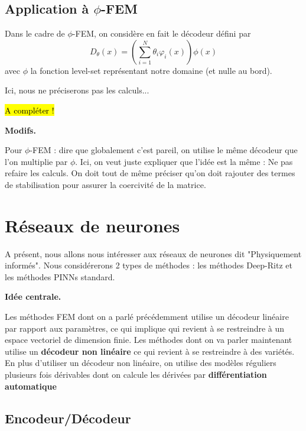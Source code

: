 \documentclass[french]{article}
\begin{document}
	\subsection{Application à $\phi$-FEM}
	
	Dans le cadre de $\phi$-FEM, on considère en fait le décodeur défini par
	\begin{equation*}
		D_\theta(x) = \left(\sum_{i=1}^N \theta_i \varphi_i(x)\right)\phi(x)
	\end{equation*}
	avec $\phi$ la fonction level-set représentant notre domaine (et nulle au bord).
	
	Ici, nous ne préciserons pas les calculs...
	
	\hl{A compléter !}
	
	\begin{tcolorbox}[
		colback=white, %
		colframe=red!70!black, %
		arc=2mm, %
		boxrule=1pt, %
		breakable, enhanced jigsaw
		]
		\textcolor{red!70!black}{\textbf{Modifs.} \\}
		
		Pour $\phi$-FEM : dire que globalement c'est pareil, on utilise le même décodeur que l'on multiplie par $\phi$. Ici, on veut juste expliquer que l'idée est la même : Ne pas refaire les calculs. On doit tout de même préciser qu'on doit rajouter des termes de stabilisation pour assurer la coercivité de la matrice.
	\end{tcolorbox}

	\section{Réseaux de neurones}

	A présent, nous allons nous intéresser aux réseaux de neurones dit "Physiquement informés". Nous considérerons 2 types de méthodes : les méthodes Deep-Ritz et les méthodes PINNs standard.
	
	\begin{tcolorbox}[
		colback=white, %
		colframe=black!70!black, %
		arc=2mm, %
		boxrule=1pt, %
		breakable, enhanced jigsaw
		]
		\textcolor{black!70!black}{\textbf{Idée centrale.} \\}
		
		Les méthodes FEM dont on a parlé précédemment utilise un décodeur linéaire par rapport aux paramètres, ce qui implique qui revient à se restreindre à un espace vectoriel de dimension finie. Les méthodes dont on va parler maintenant utilise un \textbf{décodeur non linéaire} ce qui revient à se restreindre à des variétés. En plus d'utiliser un décodeur non linéaire, on utilise des modèles réguliers plusieurs fois dérivables dont on calcule les dérivées par \textbf{différentiation automatique}
	\end{tcolorbox}

	\subsection{Encodeur/Décodeur}
	
\end{document}
